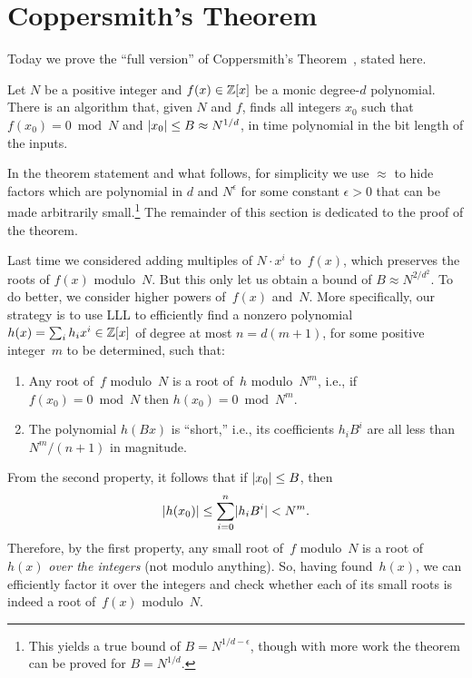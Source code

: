 \documentclass[11pt]{article}
\begin{document}
\thispagestyle{fancy} %


\section{Coppersmith's Theorem}
\label{sec:coppersmith}

Today we prove the ``full version'' of Coppersmith's
Theorem~\cite{DBLP:conf/eurocrypt/Coppersmith96}, stated here.

\begin{theorem}
  \label{thm:coppersmith}
  Let $N$ be a positive integer and $f(x) \in \mathbb{Z}[x]$ be a monic
  degree-$d$ polynomial. There is an algorithm that, given $N$ and
  $f$, finds all integers $x_{0}$ such that $f(x_{0}) = 0 \bmod N$ and
  $\lvert x_{0}\rvert \leq B \approx N^{1/d}$, in time polynomial in the bit
  length of the inputs.
\end{theorem}

In the theorem statement and what follows, for simplicity we use
$\approx$ to hide factors which are polynomial in $d$ and
$N^{\epsilon}$ for some constant $\epsilon > 0$ that can be made
arbitrarily small.\footnote{This yields a true bound of
  $B = N^{1/d-\epsilon}$, though with more work the theorem can be
  proved for $B=N^{1/d}$.} The remainder of this section is dedicated
to the proof of the theorem.

Last time we considered adding multiples of $N \cdot x^{i}$ to~$f(x)$,
which preserves the roots of $f(x)$ modulo~$N$. But this only let us
obtain a bound of $B \approx N^{2/d^{2}}$. To do better, we consider
higher powers of~$f(x)$ and~$N$. More specifically, our strategy is to
use LLL to efficiently find a nonzero polynomial
$h(x) = \sum_{i} h_{i} x^{i} \in \mathbb{Z}[x]$ of degree at most
$n = d(m+1)$, for some positive integer~$m$ to be determined, such
that:
\begin{enumerate}[itemsep=0pt]
\item Any root of~$f$ modulo~$N$ is a root of~$h$ modulo~$N^{m}$,
  i.e., if $f(x_{0}) = 0 \bmod N$ then $h(x_{0}) = 0 \bmod N^{m}$.
\item The polynomial $h(Bx)$ is ``short,'' i.e., its coefficients
  $h_{i} B^{i}$ are all less than $N^{m}/(n+1)$ in magnitude.
\end{enumerate}
From the second property, it follows that if $\lvert x_{0}\rvert \leq B$,
then
\[ \lvert h(x_{0})\rvert \leq \sum_{i=0}^{n} \lvert h_{i} B^{i}\rvert < N^{m}. \]
Therefore, by the first property, any small root of~$f$ modulo~$N$ is
a root of~$h(x)$ \emph{over the integers} (not modulo anything). So,
having found~$h(x)$, we can efficiently factor it over the integers
and check whether each of its small roots is indeed a root of~$f(x)$
modulo~$N$.
\end{document}
